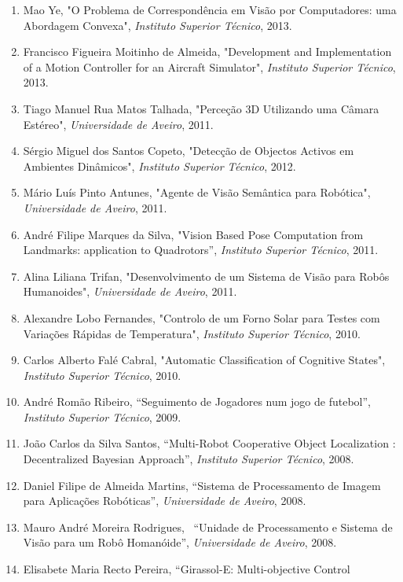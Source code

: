\documentclass[
]{article}
\begin{document}
\begin{enumerate}
  Pedro Miguel Dias Neto, "Energy Optimization in Building Water Supply
  Using Economic MPC", \emph{Instituto Superior Técnico}, 2013.
\item
  Mao Ye, "O Problema de Correspondência em Visão por Computadores: uma
  Abordagem Convexa", \emph{Instituto Superior Técnico}, 2013.
\item
  Francisco Figueira Moitinho de Almeida, "Development and
  Implementation of a Motion Controller for an Aircraft Simulator",
  \emph{Instituto Superior Técnico}, 2013.
\item
  Tiago Manuel Rua Matos Talhada, "Perceção 3D Utilizando uma Câmara
  Estéreo", \emph{Universidade de Aveiro}, 2011.
\item
  Sérgio Miguel dos Santos Copeto, "Detecção de Objectos Activos em
  Ambientes Dinâmicos", \emph{Instituto Superior Técnico}, 2012.
\item
  Mário Luís Pinto Antunes, "Agente de Visão Semântica para Robótica",
  \emph{Universidade de Aveiro}, 2011.
\item
  André Filipe Marques da Silva, "Vision Based Pose Computation from
  Landmarks: application to Quadrotors'', \emph{Instituto Superior
  Técnico}, 2011.
\item
  Alina Liliana Trifan, "Desenvolvimento de um Sistema de Visão para
  Robôs Humanoides", \emph{Universidade de Aveiro}, 2011.
\item
  Alexandre Lobo Fernandes, "Controlo de um Forno Solar para Testes com
  Variações Rápidas de Temperatura", \emph{Instituto Superior Técnico},
  2010.
\item
  Carlos Alberto Falé Cabral, "Automatic Classification of Cognitive
  States", \emph{Instituto Superior Técnico}, 2010.
\item
  André Romão Ribeiro, ``Seguimento de Jogadores num jogo de futebol'',
  \emph{Instituto Superior Técnico}, 2009.
\item
  João Carlos da Silva Santos, ``Multi-Robot Cooperative Object
  Localization : Decentralized Bayesian Approach'', \emph{Instituto
  Superior Técnico}, 2008.
\item
  Daniel Filipe de Almeida Martins, ``Sistema de Processamento de Imagem
  para Aplicações Robóticas'', \emph{Universidade de Aveiro}, 2008.
\item
  Mauro André Moreira Rodrigues,~ ``Unidade de Processamento e Sistema
  de Visão para um Robô Homanóide'', \emph{Universidade de Aveiro},
  2008.
\item
  Elisabete Maria Recto Pereira, ``Girassol-E: Multi-objective Control

\end{enumerate}
\end{document}

